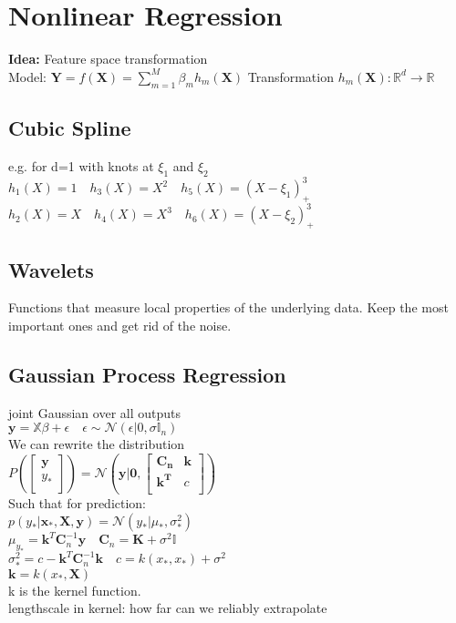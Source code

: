 \section*{Nonlinear Regression}
\textbf{Idea:} Feature space transformation\\
Model: $\mathbf{Y}=f(\mathbf{X})=\sum_{m=1}^M\beta_m h_m(\mathbf{X})$
Transformation $h_m(\mathbf{X}):\mathbb{R}^d \rightarrow \mathbb{R}$


\subsection*{Cubic Spline}
e.g. for d=1 with knots at $\xi_1$ and $\xi_2$\\
$h_1(X){=}1\quad h_3(X){=}X^2\quad h_5(X){=}(X{-}\xi_1)^3_+$
$h_2(X){=}X\quad h_4(X){=}X^3\quad h_6(X){=}(X{-}\xi_2)^3_+$

\subsection*{Wavelets}
Functions that measure local properties of the underlying data. Keep the most important ones and get rid of the noise.

\subsection*{Gaussian Process Regression}
joint Gaussian over all outputs\\
$\mathbf{y}=\mathbb{X}\beta+\epsilon \quad \epsilon\sim \mathcal{N}(\epsilon|0,\sigma\mathbb{I}_n)$\\
We can rewrite the distribution\\
$P(\begin{bmatrix}
\mathbf{y}\\
y_*\\
\end{bmatrix}){=}\mathcal{N}(\mathbf{y}|\mathbf{0},\begin{bmatrix}
\mathbf{C_n} & \mathbf{k} \\
\mathbf{k^T} & c \\
\end{bmatrix})$\\
Such that for prediction:\\
$p(y_*|\mathbf{x_*}, \mathbf{X}, \mathbf{y}){=} \mathcal{N}(y_*|\mu_{*}, \sigma^2_{*})$\\
$\mu_{y_*} = \mathbf{k}^T\mathbf{C}_n^{-1}\mathbf{y}\quad \mathbf{C}_n=\mathbf{K}+\sigma^2\mathbb{I}$\\
$\sigma^2_{*}{=}c{-}\mathbf{k}^T\mathbf{C}_n^{-1}\mathbf{k}\quad c{=}k(x_*,x_*){+}\sigma^2$\\
$\mathbf{k}=k(x_*,\mathbf{X})$\\
k is the kernel function.\\
lengthscale in kernel: how far can we reliably extrapolate


